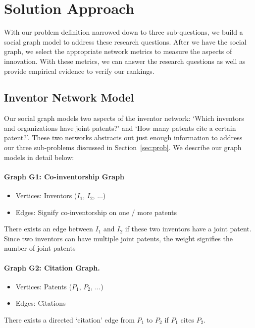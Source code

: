 \section{Solution Approach}
\label{sec:sol}
With our problem definition narrowed down to three sub-questions, we build a social graph model to address these research questions. 
After we have the social graph, we select the appropriate network metrics to measure the aspects of innovation.
With these metrics, we can answer the research questions as well as provide empirical evidence to verify our rankings.

\subsection{Inventor Network Model}
\label{sec:model}
Our social graph models two aspects of the inventor network:  `Which inventors
and organizations have joint patents?' and `How many patents cite a certain
patent?'. These two networks abstracts out just enough information to address
our three sub-problems discussed in Section~\ref{sec:prob}. We describe our graph models in detail below:

\paragraph{Graph G1: Co-inventorship Graph}

	\begin{itemize}
	\squish
		\item {Vertices:} Inventors  ($I_1$, $I_2$, ...)
		\item {Edges:} Signify co-inventorship on one / more patents
	\end{itemize}

There exists an edge between $I_1$ and $I_2$ if these two inventors have a
joint patent. Since two inventors can have multiple joint patents, the weight
signifies the number of joint patents

\paragraph{Graph G2: Citation Graph.}

	\begin{itemize}
	\squish
		\item {Vertices:} Patents ($P_1$, $P_2$, ...)
		\item {Edges:} Citations 
	\end{itemize}

There exists a directed `citation' edge from $P_1$ to $P_2$ if $P_1$ cites $P_2$.

